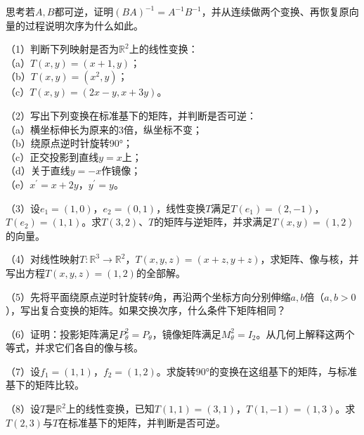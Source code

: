 {\kaiti{}思考\quad 若\(A , B\)都可逆，证明\(\left( B A \right)^{- 1} = A^{- 1} B^{- 1}\)，并从连续做两个变换、再恢复原向量的过程说明次序为什么如此。}

\begin{exercise}
（1）判断下列映射是否为\(\mathbb{R}^{2}\)上的线性变换：\\
（a）\(T \left( x , y \right) = \left( x + 1 , y \right)\)；\\
（b）\(T \left( x , y \right) = \left( x^{2} , y \right)\)；\\
（c）\(T \left( x , y \right) = \left( 2 x - y , x + 3 y \right)\)。

（2）写出下列变换在标准基下的矩阵，并判断是否可逆：\\
（a）横坐标伸长为原来的\(3\)倍，纵坐标不变；\\
（b）绕原点逆时针旋转90°；\\
（c）正交投影到直线\(y = x\)上；\\
（d）关于直线\(y = - x\)作镜像；\\
（e）\(x^{\prime} = x + 2 y\)，\(y^{\prime} = y\)。

（3）设\(e_{1} = \left( 1 , 0 \right)\)，\(e_{2} = \left( 0 , 1 \right)\)，线性变换\(T\)满足\(T \left( e_{1} \right) = \left( 2 , - 1 \right)\)，\(T \left( e_{2} \right) = \left( 1 , 1 \right)\)。求\(T \left( 3 , 2 \right)\)、\(T\)的矩阵与逆矩阵，并求满足\(T \left( x , y \right) = \left( 1 , 2 \right)\)的向量。

（4）对线性映射\(T : \mathbb{R}^{3} \longrightarrow \mathbb{R}^{2}\)，\(T \left( x , y , z \right) = \left( x + z , y + z \right)\)，求矩阵、像与核，并写出方程\(T \left( x , y , z \right) = \left( 1 , 2 \right)\)的全部解。

\begin{samepage}
（5）先将平面绕原点逆时针旋转\(\theta\)角，再沿两个坐标方向分别伸缩\(a , b\)倍（\(a , b > 0\)），写出复合变换的矩阵。如果交换次序，什么条件下矩阵相同？
\par
\end{samepage}

（6）证明：投影矩阵满足\(P_{\theta}^{2} = P_{\theta}\)，镜像矩阵满足\(M_{\theta}^{2} = I_{2}\)。从几何上解释这两个等式，并求它们各自的像与核。

（7）设\(f_{1} = \left( 1 , 1 \right)\)，\(f_{2} = \left( 1 , 2 \right)\)。求旋转90°的变换在这组基下的矩阵，与标准基下的矩阵比较。

（8）设\(T\)是\(\mathbb{R}^{2}\)上的线性变换，已知\(T \left( 1 , 1 \right) = \left( 3 , 1 \right)\)，\(T \left( 1 , - 1 \right) = \left( 1 , 3 \right)\)。求\(T \left( 2 , 3 \right)\)与\(T\)在标准基下的矩阵，并判断是否可逆。


\end{exercise}
